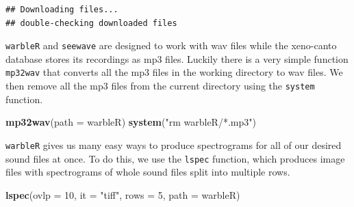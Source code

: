 \documentclass[
]{krantz}
\newenvironment{Shaded}{\begin{snugshade}}{\end{snugshade}}
\newcommand{\DataTypeTok}[1]{\textcolor[rgb]{0.13,0.29,0.53}{#1}}
\newcommand{\DecValTok}[1]{\textcolor[rgb]{0.00,0.00,0.81}{#1}}
\newcommand{\KeywordTok}[1]{\textcolor[rgb]{0.13,0.29,0.53}{\textbf{#1}}}
\newcommand{\NormalTok}[1]{#1}
\newcommand{\OperatorTok}[1]{\textcolor[rgb]{0.81,0.36,0.00}{\textbf{#1}}}
\newcommand{\StringTok}[1]{\textcolor[rgb]{0.31,0.60,0.02}{#1}}
\begin{document}
\begin{Shaded}
\end{Shaded}

\begin{verbatim}
## Downloading files...
## double-checking downloaded files
\end{verbatim}

\texttt{warbleR} and \texttt{seewave} are designed to work with wav files while the xeno-canto database stores its recordings as mp3 files. Luckily there is a very simple function \texttt{mp32wav} that converts all the mp3 files in the working directory to wav files. We then remove all the mp3 files from the current directory using the \texttt{system} function.

\begin{Shaded}
\begin{Highlighting}[]
\KeywordTok{mp32wav}\NormalTok{(}\DataTypeTok{path =} \StringTok{\textquotesingle{}warbleR\textquotesingle{}}\NormalTok{)}
\KeywordTok{system}\NormalTok{(}\StringTok{"rm warbleR/*.mp3"}\NormalTok{)}
\end{Highlighting}
\end{Shaded}

\texttt{warbleR} gives us many easy ways to produce spectrograms for all of our desired sound files at once. To do this, we use the \texttt{lspec} function, which produces image files with spectrograms of whole sound files split into multiple rows.

\begin{Shaded}
\begin{Highlighting}[]
\KeywordTok{lspec}\NormalTok{(}\DataTypeTok{ovlp =} \DecValTok{10}\NormalTok{, }\DataTypeTok{it =} \StringTok{"tiff"}\NormalTok{, }\DataTypeTok{rows =} \DecValTok{5}\NormalTok{, }\DataTypeTok{path =} \StringTok{\textquotesingle{}warbleR\textquotesingle{}}\NormalTok{)}
\end{Highlighting}
\end{Shaded}
\end{document}
